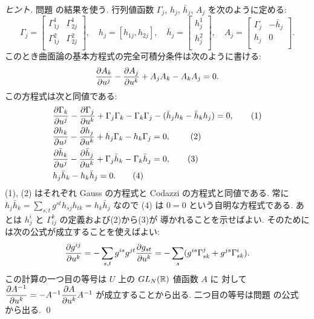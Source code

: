 \documentclass[12pt,twoside]{jarticle}
\begin{document}
\begin{proof}[ヒント]
 問題  の結果を使う. 
 行列値函数 $\Gamma_j$, $h_j$, $\bar h_j$, $A_j$ を次のように定める:
 \begin{equation*}
  \Gamma_j =
  \begin{bmatrix}
   \Gamma^1_{1j} & \Gamma^1_{2j} \\
   \Gamma^2_{1j} & \Gamma^2_{2j} \\
  \end{bmatrix},
  \quad
  h_j = [h_{1j}, h_{2j}],
  \quad
  \bar h_j =
  \begin{bmatrix}
   h^1_j \\
   h^2_j \\
  \end{bmatrix},
  \quad
  A_j =
  \begin{bmatrix}
   \Gamma_j & -\bar h_j \\
   h_j      & 0 \\
  \end{bmatrix}.
 \end{equation*}
 このとき曲面論の基本方程式の完全可積分条件は次のように書ける:
 \begin{equation*}
  \frac{\partial A_k}{\partial u^j} - \frac{\partial A_j}{\partial u^k} + A_j A_k - A_k A_j = 0.
 \end{equation*}
 この方程式は次と同値である:
 \begin{align*}
  &
  \frac{\partial \Gamma_k}{\partial u^j} - \frac{\partial \Gamma_j}{\partial u^k}
  + \Gamma_j\Gamma_k - \Gamma_k\Gamma_j
  -(\bar h_j h_k - \bar h_k h_j)
  = 0,
  \tag{1}
  \\ &
  \frac{\partial h_k}{\partial u^j} - \frac{\partial h_j}{\partial u^k}
  + h_j\Gamma_k - h_k\Gamma_j
  = 0,\
  \tag{2}
  \\ &
  \frac{\partial \bar h_k}{\partial u^j} - \frac{\partial \bar h_j}{\partial u^k}
  + \Gamma_j\bar h_k - \Gamma_k\bar h_j
  = 0,
  \tag{3}
  \\ &
  h_j\bar h_k - h_k\bar h_j = 0.
  \tag{4}
 \end{align*}
 (1), (2) はそれぞれ Gauss の方程式と Codazzi の方程式と同値である.
 常に $h_j\bar h_k = \sum_{s,t}g^{st}h_{sj}h_{tk} = h_k\bar h_j$ 
 なので (4) は $0=0$ という自明な方程式である.
 あとは $h^i_j$ と $\Gamma^k_{ij}$ の定義および(2)から(3)が
 導かれることを示せばよい.
 そのためには次の公式が成立することを使えばよい:
 \begin{equation*}
 \frac{\partial g^{ij}}{\partial u^k}
 =
 - \sum_{s,t} g^{is}g^{jt}\frac{\partial g_{st}}{\partial u^k}
 =
 - \sum_s (g^{is}\Gamma^j_{sk} + g^{js}\Gamma^i_{sk}).
 \end{equation*}
 この計算の一つ目の等号は $U$ 上の $GL_N({\mathbb R})$ 値函数 $A$ に
 対して $\dfrac{\partial A^{-1}}{\partial u^k} = -A^{-1}\dfrac{\partial A}{\partial u^k}A^{-1}$ 
 が成立することから出る. 二つ目の等号は問題 \qref{q:Ch=ggg} の公式
 から出る.
 \qed
\end{proof}
\end{document}
